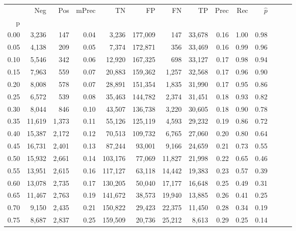 \begin{tabular}{rrrrrrrrrrrrrr}
\toprule
{} &     Neg &    Pos & mPrec &       TN &       FP &      FN &      TP &  Prec &   Rec & $\hat{p}$ \\
p    &         &        &       &          &          &         &         &       &       &           \\
\midrule
0.00 &   3,236 &    147 &  0.04 &    3,236 &  177,009 &     147 &  33,678 &  0.16 &  1.00 &      0.98 \\
0.05 &   4,138 &    209 &  0.05 &    7,374 &  172,871 &     356 &  33,469 &  0.16 &  0.99 &      0.96 \\
0.10 &   5,546 &    342 &  0.06 &   12,920 &  167,325 &     698 &  33,127 &  0.17 &  0.98 &      0.94 \\
0.15 &   7,963 &    559 &  0.07 &   20,883 &  159,362 &   1,257 &  32,568 &  0.17 &  0.96 &      0.90 \\
0.20 &   8,008 &    578 &  0.07 &   28,891 &  151,354 &   1,835 &  31,990 &  0.17 &  0.95 &      0.86 \\
0.25 &   6,572 &    539 &  0.08 &   35,463 &  144,782 &   2,374 &  31,451 &  0.18 &  0.93 &      0.82 \\
0.30 &   8,044 &    846 &  0.10 &   43,507 &  136,738 &   3,220 &  30,605 &  0.18 &  0.90 &      0.78 \\
0.35 &  11,619 &  1,373 &  0.11 &   55,126 &  125,119 &   4,593 &  29,232 &  0.19 &  0.86 &      0.72 \\
0.40 &  15,387 &  2,172 &  0.12 &   70,513 &  109,732 &   6,765 &  27,060 &  0.20 &  0.80 &      0.64 \\
0.45 &  16,731 &  2,401 &  0.13 &   87,244 &   93,001 &   9,166 &  24,659 &  0.21 &  0.73 &      0.55 \\
0.50 &  15,932 &  2,661 &  0.14 &  103,176 &   77,069 &  11,827 &  21,998 &  0.22 &  0.65 &      0.46 \\
0.55 &  13,951 &  2,615 &  0.16 &  117,127 &   63,118 &  14,442 &  19,383 &  0.23 &  0.57 &      0.39 \\
0.60 &  13,078 &  2,735 &  0.17 &  130,205 &   50,040 &  17,177 &  16,648 &  0.25 &  0.49 &      0.31 \\
0.65 &  11,467 &  2,763 &  0.19 &  141,672 &   38,573 &  19,940 &  13,885 &  0.26 &  0.41 &      0.25 \\
0.70 &   9,150 &  2,435 &  0.21 &  150,822 &   29,423 &  22,375 &  11,450 &  0.28 &  0.34 &      0.19 \\
0.75 &   8,687 &  2,837 &  0.25 &  159,509 &   20,736 &  25,212 &   8,613 &  0.29 &  0.25 &      0.14 \\

\end{tabular}
